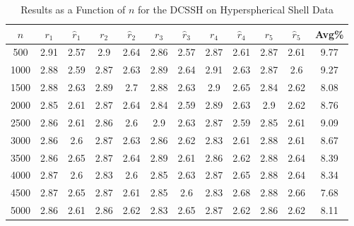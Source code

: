 \documentclass[11pt,twoside]{report}
\theoremstyle{definition}
\numberwithin{theorem}{section}
\numberwithin{definition}{section}
\numberwithin{lemma}{section}
\numberwithin{proposition}{section}
\numberwithin{equation}{section}
\numberwithin{figure}{section}
\begin{document}
\begin{appendices}
    \begin{table}[ht]
        \centering
        \begin{tabular}{|c||cc||cc||cc||cc||cc||c|} \hline
            $n$&$r_1$&$\hat{r}_1$&$r_2$&$\hat{r}_2$&$r_3$&$\hat{r}_3$&$r_4$&$\hat{r}_4$&$r_5$&$\hat{r}_5$&Avg\% \\ \hline
            500&2.91&2.57&2.9&2.64&2.86&2.57&2.87&2.61&2.87&2.61&9.77 \\
            1000&2.88&2.59&2.87&2.63&2.89&2.64&2.91&2.63&2.87&2.6&9.27 \\
            1500&2.88&2.63&2.89&2.7&2.88&2.63&2.9&2.65&2.84&2.62&8.08 \\
            2000&2.85&2.61&2.87&2.64&2.84&2.59&2.89&2.63&2.9&2.62&8.76 \\
            2500&2.86&2.61&2.86&2.6&2.9&2.63&2.87&2.59&2.85&2.61&9.09 \\
            3000&2.86&2.6&2.87&2.63&2.86&2.62&2.83&2.61&2.88&2.61&8.67 \\
            3500&2.86&2.65&2.87&2.64&2.89&2.61&2.86&2.62&2.88&2.64&8.39 \\
            4000&2.87&2.6&2.83&2.6&2.85&2.63&2.87&2.65&2.88&2.64&8.34 \\
            4500&2.87&2.65&2.87&2.61&2.85&2.6&2.83&2.68&2.88&2.66&7.68 \\
            5000&2.86&2.61&2.86&2.62&2.83&2.65&2.87&2.62&2.86&2.62&8.11 \\ \hline
        \end{tabular}
        \caption{Results as a Function of $n$ for the DCSSH on Hyperspherical Shell Data}
        \label{tab:hyperspherical_shell_dcssh_table_n}
    \end{table}
    

\end{appendices}
\end{document}
